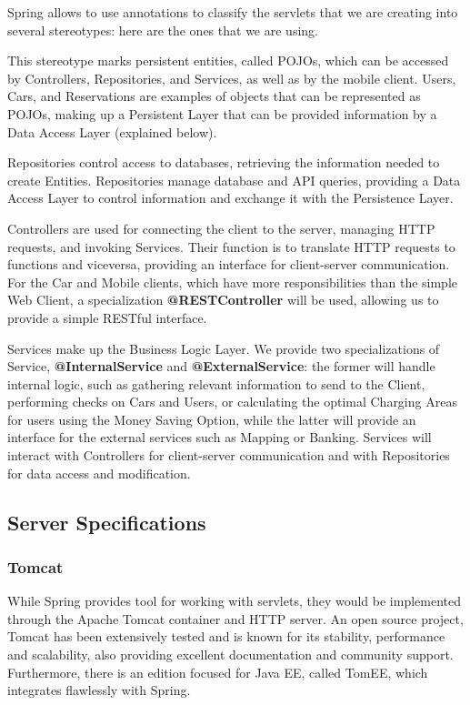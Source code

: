 \documentclass[12pt]{article}
\begin{document}
Spring allows to use annotations to classify the servlets that we are creating into several stereotypes: here are the ones that we are using.
\begin{description}[leftmargin=!,labelwidth=\widthof{\bfseries @Repository}]
	\item[@Entity] This stereotype marks persistent entities, called POJOs, which can be accessed by Controllers, Repositories, and Services, as well as by the mobile client. Users, Cars, and Reservations are examples of objects that can be represented as POJOs, making up a Persistent Layer that can be provided information by a Data Access Layer (explained below).
	\item[@Repository] Repositories control access to databases, retrieving the information needed to create Entities. Repositories manage database and API queries, providing a Data Access Layer to control information and exchange it with the Persistence Layer.
	\item[@Controller] Controllers are used for connecting the client to the server, managing HTTP requests, and invoking Services. Their function is to translate HTTP requests to functions and viceversa, providing an interface for client-server communication. For the Car and Mobile clients, which have more responsibilities than the simple Web Client, a specialization \textbf{@RESTController} will be used, allowing us to provide a simple RESTful interface.
	\item[@Service] Services make up the Business Logic Layer. We provide two specializations of Service, \textbf{@InternalService} and \textbf{@ExternalService}: the former will handle internal logic, such as gathering relevant information to send to the Client, performing checks on Cars and Users, or calculating the optimal Charging Areas for users using the Money Saving Option, while the latter will provide an interface for the external services such as Mapping or Banking. Services will interact with Controllers for client-server communication and with Repositories for data access and modification.
\end{description}

\subsection{Server Specifications}
\label{server}
\subsubsection{Tomcat}
While Spring provides tool for working with servlets, they would be implemented through the Apache Tomcat container and HTTP server. An open source project, Tomcat has been extensively tested and is known for its stability, performance and scalability, also providing excellent documentation and community support. Furthermore, there is an edition focused for Java EE, called TomEE, which integrates flawlessly with Spring.
\end{document}
